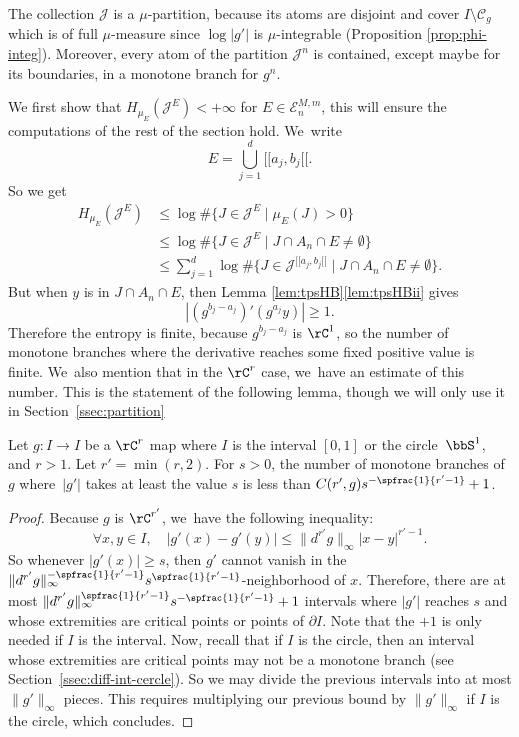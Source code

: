 \begin{rmq}
\label{rmq:monot}
The collection $\mathcal{J}$ is a $\mu$-partition, because its atoms are disjoint and cover $I \setminus \mathcal{C}_g$ which is of full $\mu$-measure since $\log |g'|$ is $\mu$-integrable (Proposition \ref{prop:phi-integ}).
Moreover, every atom of the partition $\mathcal{J}^n$ is contained, except maybe for its boundaries, in a monotone branch for $g^n$.
\end{rmq}

We first show that $H_{\mu_E}(\mathcal{J}^E) < +\infty$ for $E \in \mathcal{E}_n^{M,m}$, this will ensure the computations of the rest of the section hold. We~write
\[
E = \bigcup_{j = 1}^d [\![ a _j, b_j [\![.
\]
So we get
\begin{align*}
H_{\mu_E}(\mathcal{J}^E) &\leq \log \# \{ J \in \mathcal{J}^E \mid \mu_E(J) > 0 \}\\
&\leq \log \# \{ J \in \mathcal{J}^E \mid J \cap A_n \cap E \neq \emptyset \}\\
&\leq \sum_{j=1}^d \log \# \{ J \in \mathcal{J}^{[\![ a_j, b_j [\![} \mid J \cap A_n \cap E \neq \emptyset \}.
\end{align*}
But when $y$ is in $J \cap A_n \cap E$, then Lemma \ref{lem:tpsHB}\eqref{lem:tpsHBii} gives
\[
|(g^{b_j - a_j})'(g^{a_j} y)| \geq 1.
\]
Therefore the entropy is finite, because $g^{b_j - a_j}$ is $\rC^1$, so the number of monotone branches where the derivative reaches some fixed positive value is finite. We~also mention that in the $\rC^r$ case, we~have an estimate of this number.
This is the statement of the following lemma, though we will only use it in Section~\ref{ssec:partition}

\begin{lem}
\label{lem:brch-mon-DM}
Let $g : I \to I$ be a $\rC^r$ map where $I$ is the interval $[0,1]$ or the circle~$\bbS^1$, and $r>1$.
Let $r' = \min(r,2)$.
For $s > 0$, the number of monotone branches of $g$ where~$|g'|$ takes at least the value $s$ is less than $C(r',g) s^{-\spfrac{1}{r'-1}} + 1$.
\end{lem}

\begin{proof}
Because $g$ is $\rC^{r'}$, we~have the following inequality:
\[
\forall x,y \in I,\quad |g'(x)-g'(y)| \leq \| d^{r'} g \|_{\infty} |x-y|^{r' - 1}.
\]
So whenever $|g'(x)| \geq s$, then $g'$ cannot vanish in the $\| d^{r'} g \|_{\infty}^{- \spfrac{1}{r' - 1}} s^{\spfrac{1}{r' - 1}}$-neighborhood of $x$.
Therefore, there are at most $\| d^{r'} g \|_{\infty}^{\spfrac{1}{r' - 1}} s^{- \spfrac{1}{r' - 1}} + 1$ intervals where $|g'|$ reaches $s$ and whose extremities are critical points or points of $\partial I$.
Note that the $+1$ is only needed if $I$ is the interval.
Now, recall that if $I$ is the circle, then an interval whose extremities are critical points may not be a monotone branch (see Section~\ref{ssec:diff-int-cercle}).
So we may divide the previous intervals into at most $\| g' \|_{\infty}$ pieces.
This requires multiplying our previous bound by $\| g' \|_{\infty}$ if $I$ is the circle, which concludes.
\end{proof}

